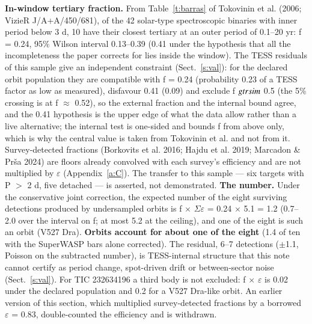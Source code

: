 \documentclass{aa}
\begin{document}
\textbf{In-window tertiary fraction.} From Table~\ref{t:barras} of Tokovinin et al. (2006; VizieR J/A+A/450/681), of the 42 solar-type spectroscopic binaries with inner period below 3 d, 10 have their closest tertiary at an outer period of 0.1--20 yr: f = 0.24, 95\% Wilson interval 0.13--0.39 (0.41 under the hypothesis that all the incompleteness the paper corrects for lies inside the window). The TESS residuals of this sample give an independent constraint (Sect.~\ref{s:val}): for the declared orbit population they are compatible with f = 0.24 (probability 0.23 of a TESS factor as low as measured), disfavour 0.41 (0.09) and exclude f $\\gtrsim$ 0.5 (the 5\% crossing is at f $\approx$ 0.52), so the external fraction and the internal bound agree, and the 0.41 hypothesis is the upper edge of what the data allow rather than a live alternative; the internal test is one-sided and bounds f from above only, which is why the central value is taken from Tokovinin et al. and not from it. Survey-detected fractions (Borkovits et al. 2016; Hajdu et al. 2019; Marcadon \& Prša 2024) are floors already convolved with each survey's efficiency and are not multiplied by $\varepsilon$ (Appendix~\ref{a:C}). The transfer to this sample --- six targets with P $>$ 2 d, five detached --- is asserted, not demonstrated.
\textbf{The number.} Under the conservative joint correction, the expected number of the eight surviving detections produced by undersampled orbits is f $\times$ $\Sigma\varepsilon$ = 0.24 $\times$ 5.1 = 1.2 (0.7--2.0 over the interval on f; at most 5.2 at the ceiling), and one of the eight is such an orbit (V527 Dra). \textbf{Orbits account for about one of the eight} (1.4 of ten with the SuperWASP bars alone corrected). The residual, 6--7 detections ($\pm$1.1, Poisson on the subtracted number), is TESS-internal structure that this note cannot certify as period change, spot-driven drift or between-sector noise (Sect.~\ref{s:val}). For TIC 232634196 a third body is not excluded: f $\times$ $\varepsilon$ is 0.02 under the declared population and 0.2 for a V527 Dra-like orbit. An earlier version of this section, which multiplied survey-detected fractions by a borrowed $\varepsilon$ = 0.83, double-counted the efficiency and is withdrawn.
\end{document}
